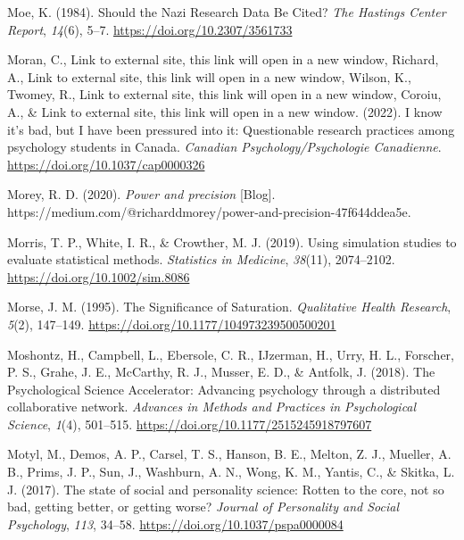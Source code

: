 \documentclass[
  letterpaper,
  DIV=11,
  numbers=noendperiod]{scrreprt}
\newlength{\cslhangindent}
\newlength{\cslentryspacingunit} %
\newenvironment{CSLReferences}[2] %
 {%
  \setlength{\parindent}{0pt}
  \ifodd #1
  \let\oldpar\par
  \def\par{\hangindent=\cslhangindent\oldpar}
  \fi
  \setlength{\parskip}{#2\cslentryspacingunit}
 }%
 {}
\begin{document}
\begin{CSLReferences}{1}{0}
\leavevmode{}%
Moe, K. (1984). Should the {Nazi Research Data Be Cited}? \emph{The
Hastings Center Report}, \emph{14}(6), 5--7.
\url{https://doi.org/10.2307/3561733}

\leavevmode{}%
Moran, C., Link to external site, this link will open in a new window,
Richard, A., Link to external site, this link will open in a new window,
Wilson, K., Twomey, R., Link to external site, this link will open in a
new window, Coroiu, A., \& Link to external site, this link will open in
a new window. (2022). I know it's bad, but {I} have been pressured into
it: {Questionable} research practices among psychology students in
{Canada}. \emph{Canadian Psychology/Psychologie Canadienne}.
\url{https://doi.org/10.1037/cap0000326}

\leavevmode{}%
Morey, R. D. (2020). \emph{Power and precision} {[}Blog{]}.
https://medium.com/@richarddmorey/power-and-precision-47f644ddea5e.

\leavevmode{}%
Morris, T. P., White, I. R., \& Crowther, M. J. (2019). Using simulation
studies to evaluate statistical methods. \emph{Statistics in Medicine},
\emph{38}(11), 2074--2102. \url{https://doi.org/10.1002/sim.8086}

\leavevmode{}%
Morse, J. M. (1995). The {Significance} of {Saturation}.
\emph{Qualitative Health Research}, \emph{5}(2), 147--149.
\url{https://doi.org/10.1177/104973239500500201}

\leavevmode{}%
Moshontz, H., Campbell, L., Ebersole, C. R., IJzerman, H., Urry, H. L.,
Forscher, P. S., Grahe, J. E., McCarthy, R. J., Musser, E. D., \&
Antfolk, J. (2018). The {Psychological Science Accelerator}: {Advancing}
psychology through a distributed collaborative network. \emph{Advances
in Methods and Practices in Psychological Science}, \emph{1}(4),
501--515. \url{https://doi.org/10.1177/2515245918797607}

\leavevmode{}%
Motyl, M., Demos, A. P., Carsel, T. S., Hanson, B. E., Melton, Z. J.,
Mueller, A. B., Prims, J. P., Sun, J., Washburn, A. N., Wong, K. M.,
Yantis, C., \& Skitka, L. J. (2017). The state of social and personality
science: {Rotten} to the core, not so bad, getting better, or getting
worse? \emph{Journal of Personality and Social Psychology}, \emph{113},
34--58. \url{https://doi.org/10.1037/pspa0000084}


\end{CSLReferences}
\end{document}
